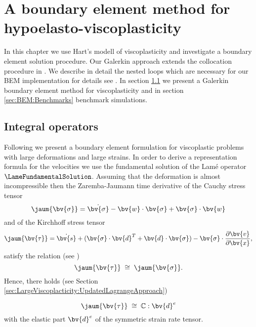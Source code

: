 \section{A boundary element method for hypoelasto-viscoplasticity}\label{sec:BEM_HyperElasto_VP}

In this chapter we use Hart's modell of viscoplasticity and investigate a boundary element solution procedure. Our  Galerkin approach extends the collocation procedure in \cite{MuCha84,Mu82}. We describe in detail the nested loops which are necessary for our BEM implementation for details see \cite{DonigaDipl05}. In section \ref{sec:BEM} we present a Galerkin boundary element method for viscoplasticity and in section \ref{sec:BEM:Benchmarks}  benchmark simulations.



% 
% 
\subsection{Integral operators}\label{sec:BEM}
Following \cite{MuCha84} we present a boundary element formulation for viscoplastic problems with large deformations and large strains. In order to derive a representation formula  for the velocities  we use the fundamental solution of the Lam\'e operator  $\LameFundamentalSolution$. Assuming that the deformation is almost incompressible then the Zaremba-Jaumann time derivative of the Cauchy stress tensor 
\begin{equation}
\jaum{\bv{\sigma}}=\dot{\bv{\sigma}}-\bv{w}\cdot\bv{\sigma}+\bv{\sigma}\cdot\bv{w}
\end{equation} 
and of the Kirchhoff stress tensor 
\begin{equation}\label{KirchhoffDef}
\jaum{\bv{\tau}}=\dot{\bv{s}}+(\bv{\sigma}\cdot\bv{d}^{T}+\bv{d}\cdot\bv{\sigma})-\bv{\sigma}\cdot\frac{\partial \bv{v}}{ \partial \bv{x}},
\end{equation} 
satisfy the relation (see \cite{MuCha84a,Mu82,YamHir78})
\begin{equation}
\jaum{\bv{\tau}}\;\cong\;\jaum{\bv{\sigma}}.
\end{equation}  
Hence, there holds (see Section \ref{sec:LargeViscoplacticity:UpdatedLagrangeApproach})

\begin{equation}
\jaum{\bv{\tau}}\;\cong\;\mathbb{C}:\bv{d}^{e}\label{hypo2}
\end{equation} 
with the elastic part $\bv{d}^{e}$ of the symmetric strain rate tensor. 

